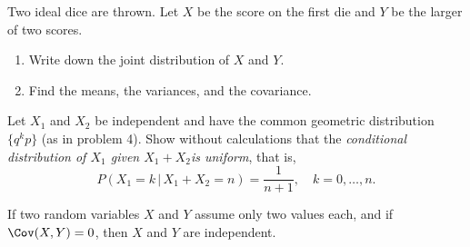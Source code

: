 \begin{problem}[Handout 15, \# 18]
  Two ideal dice are thrown. Let \(X\) be the score on the first die and
  \(Y\) be the larger of two scores.
  \begin{enumerate}[label=(\alph*),noitemsep]
  \item Write down the joint distribution of \(X\) and \(Y\).
  \item Find the means, the variances, and the covariance.
  \end{enumerate}
  \end{problem}
\begin{solution}

\end{solution}
\newpage

\begin{problem}[Handout 15, \# 19]
  Let \(X_1\) and \(X_2\) be independent and have the common
  geometric distribution \(\{q^kp\}\) (as in problem 4). Show without
  calculations that the \emph{conditional distribution of \(X_1\) given
    \(X_1+X_2\)is uniform}, that is,
  \begin{equation}
    \label{eq:12:uniform-conditional-pmf}
    P(X_1=k\,|\,X_1+X_2=n)=\frac{1}{n+1},\quad k=0,\dotsc,n.
  \end{equation}
\end{problem}
\begin{solution}

\end{solution}
\newpage

\begin{problem}[Handout 15, \# 20]
  If two random variables \(X\) and \(Y\) assume only two values
  each, and if \(\Cov(X,Y)=0\), then \(X\) and \(Y\) are
  independent.
\end{problem}
\begin{solution}

\end{solution}

